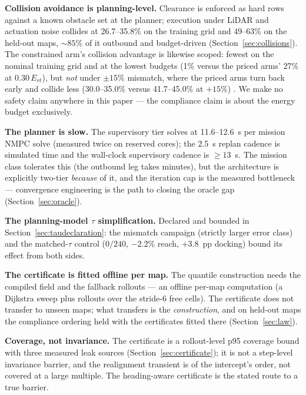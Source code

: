 \documentclass[preprint,12pt]{elsarticle}
\begin{document}
\textbf{Collision avoidance is planning-level.} Clearance is enforced
as hard rows against a known obstacle set at the planner; execution
under LiDAR and actuation noise collides at 26.7--35.8\% on the
training grid and 49--63\% on the held-out maps, ${\sim}85\%$ of it
outbound and budget-driven (Section~\ref{sec:collisions}). The
constrained arm's collision advantage is likewise scoped: fewest on
the nominal training grid and at the lowest budgets (1\% versus the
priced arms' 27\% at $0.30\,E_{rt}$), but \emph{not} under
$\pm 15\%$ mismatch, where the priced arms turn back early and
collide less (30.0--35.0\% versus 41.7--45.0\% at $+15\%$)
. We make no safety claim anywhere in
this paper --- the compliance claim is about the energy budget
exclusively.

\textbf{The planner is slow.} The supervisory tier solves at
11.6--12.6~s per mission NMPC solve (measured twice on reserved
cores); the 2.5~s replan cadence is simulated time and the wall-clock
supervisory cadence is $\ge 13$~s. The mission class tolerates this
(the outbound leg takes minutes), but the architecture is explicitly
two-tier \emph{because} of it, and the iteration cap is the measured
bottleneck --- convergence engineering is the path to closing the
oracle gap (Section~\ref{sec:oracle}).

\textbf{The planning-model $\tau$ simplification.} Declared and
bounded in Section~\ref{sec:taudeclaration}: the mismatch campaign
(strictly larger error class) and the matched-$\tau$ control
($0/240$, $-2.2\%$ reach, $+3.8$~pp docking) bound its effect from
both sides.

\textbf{The certificate is fitted offline per map.} The quantile
construction needs the compiled field and the fallback rollouts ---
an offline per-map computation (a Dijkstra sweep plus rollouts over
the stride-6 free cells). The certificate does not transfer to
unseen maps; what transfers is the \emph{construction}, and on
held-out maps the compliance ordering held with the certificates
fitted there (Section~\ref{sec:law}).

\textbf{Coverage, not invariance.} The certificate is a
rollout-level p95 coverage bound with three measured leak sources
(Section~\ref{sec:certificate}); it is not a step-level invariance
barrier, and the realignment transient is of the intercept's order,
not covered at a large multiple. The heading-aware certificate is
the stated route to a true barrier.
\end{document}
